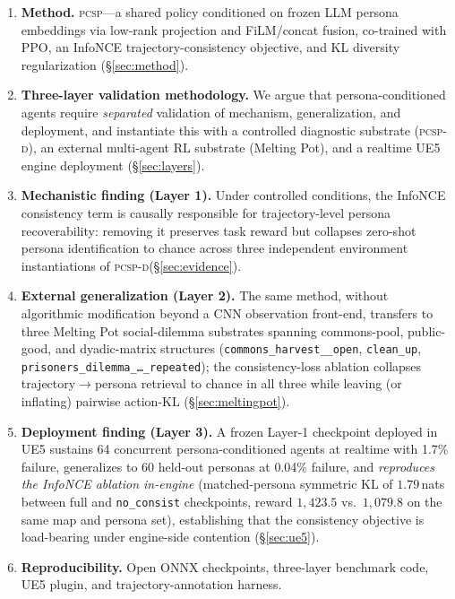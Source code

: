 \documentclass[conference]{IEEEtran}
\newcommand{\PCSP}{\textsc{pcsp}\xspace}
\newcommand{\PCSPD}{\textsc{pcsp-d}\xspace}
\begin{document}
\begin{enumerate}
  \setlength\itemsep{2pt}
  \item \textbf{Method.} \PCSP{}---a shared policy conditioned on frozen LLM
    persona embeddings via low-rank projection and FiLM/concat fusion,
    co-trained with PPO, an InfoNCE trajectory-consistency objective, and
    KL diversity regularization (\S\ref{sec:method}).
  \item \textbf{Three-layer validation methodology.} We argue that
    persona-conditioned agents require \emph{separated} validation of
    mechanism, generalization, and deployment, and instantiate this with a
    controlled diagnostic substrate (\PCSPD), an external multi-agent RL
    substrate (Melting Pot), and a realtime UE5 engine deployment
    (\S\ref{sec:layers}).
  \item \textbf{Mechanistic finding (Layer 1).} Under controlled conditions,
    the InfoNCE consistency term is causally responsible for trajectory-level
    persona recoverability: removing it preserves task reward but collapses
    zero-shot persona identification to chance across three independent
    environment instantiations of \PCSPD (\S\ref{sec:evidence}).
  \item \textbf{External generalization (Layer 2).} The same method, without
    algorithmic modification beyond a CNN observation front-end, transfers to
    three Melting Pot social-dilemma substrates spanning commons-pool,
    public-good, and dyadic-matrix structures
    (\texttt{commons\_harvest\_\_open}, \texttt{clean\_up},
    \texttt{prisoners\_dilemma\_\dots\_repeated}); the consistency-loss
    ablation collapses trajectory$\to$persona retrieval to chance in all
    three while leaving (or inflating) pairwise action-KL
    (\S\ref{sec:meltingpot}).
  \item \textbf{Deployment finding (Layer 3).} A frozen Layer-1 checkpoint
    deployed in UE5 sustains 64 concurrent persona-conditioned agents at
    realtime with 1.7\% failure, generalizes to 60 held-out personas at
    0.04\% failure, and \emph{reproduces the InfoNCE ablation in-engine}
    (matched-persona symmetric KL of $1.79$\,nats between full and
    \texttt{no\_consist} checkpoints, reward $1{,}423.5$ vs.\ $1{,}079.8$
    on the same map and persona set), establishing that the consistency
    objective is load-bearing under engine-side contention
    (\S\ref{sec:ue5}).
  \item \textbf{Reproducibility.} Open ONNX checkpoints, three-layer
    benchmark code, UE5 plugin, and trajectory-annotation harness.
\end{enumerate}
\end{document}
